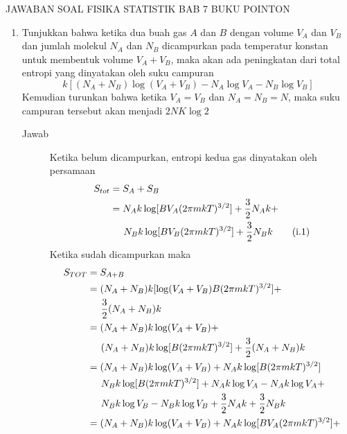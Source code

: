 \documentclass[a4paper , 12 pt]{article}
\begin{document}
\centering
JAWABAN SOAL FISIKA  STATISTIK BAB 7 BUKU POINTON 

\begin{enumerate}
	\item Tunjukkan bahwa ketika dua buah gas $A$ dan $B$ dengan volume $V_A$ dan $V_B$ dan jumlah molekul $N_A$ dan $N_B$ dicampurkan pada temperatur konstan untuk membentuk volume  $V_A + V_B$, maka akan ada peningkatan dari total entropi yang dinyatakan oleh suku campuran  
	\[
		k [ (N_A + N_B ) \log(V_A + V_B ) - N_A \log V_A - N_B \log V_B ]
	\]
	Kemudian  turunkan bahwa ketika $V_A = V_B$ dan $N_A = N_B = N$,    maka suku campuran tersebut akan menjadi $2 NK \log 2$ 
	\begin{description}
	\item[Jawab] 
	Ketika belum dicampurkan, entropi kedua gas dinyatakan oleh persamaan
	\begin{align}
	S_{tot} & = S_A + S_B  \nonumber \\
	& = N_A k \log [B V_A (2 \pi m k T)^{3/2} ] +\frac{3}{2} N_A k + \nonumber \\
	& \hspace{0.5 cm} N_B k \log [B V_B (2\pi m k T)^{3/2}] + \frac{3}{2} N_B k \tag{i.1}
	\end{align}
	Ketika sudah dicampurkan maka 
	\begin{align}
	S_{TOT} & = S_{A+ B} \nonumber \\
	& = (N_A + N_B ) k [\log (V_A + V_B )B (2 \pi m kT)^{3/2} ] + \nonumber \\ 
	& \hspace{0.5 cm } \frac{3}{2} (N_A + N_B ) k  \nonumber \\
	& = (N_A + N_B )k \log (V_A + V_B ) + 
	\nonumber \\ 
	& \hspace{0.5 cm } (N_A + N_B) k \log [B(2 \pi m k T)^{3/2}] + \frac{3}{2} (N_A + N_B) k \nonumber \\
	& = (N_A + N_B) k \log (V_A + V_B) + N_A  k \log [B (2 \pi m k T)^{3/2}]  \nonumber  \\
	& \hspace{0.5 cm }  N_B  k \log [B (2 \pi m k T)^{3/2}] + N_A k \log V_A - N_A k \log V_A + \nonumber \\  & \hspace{0.5 cm}N_B k \log V_B - N_B k \log V_B + \frac{3}{2} N_A k + \frac{3}{2} N_B k \nonumber  \\
	& =  (N_A + N_B) k \log (V_A + V_B) + N_A k \log [B V_A (2 \pi m kT)^{3/2}] + \nonumber \\ 

\end{align}
\end{description}
\end{enumerate}
\end{document}
